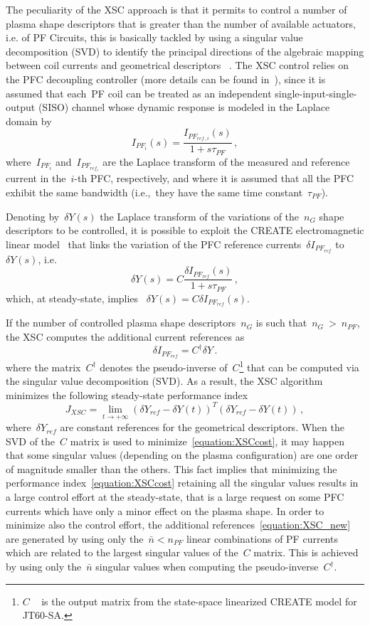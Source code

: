 The peculiarity of the XSC approach is that it permits to control a number of plasma shape descriptors that is greater than the number of available actuators, i.e. of PF Circuits, this  is basically tackled by using a singular value decomposition (SVD) to identify the principal directions of the algebraic mapping between coil currents and geometrical descriptors ~\cite{Albanese2005}. The XSC control relies on the PFC decoupling controller (more details can be found in~\cite[Section~4.4]{NCruz}), since it is assumed that each~PF coil can be treated as an independent single-input-single-output (SISO) channel whose dynamic response is modeled in the Laplace domain by
\[
I_{PF_i}(s) = \frac{I_{PF_{ref\,,i}}(s)}{1+s\tau_{PF}}\,,
\]
where~$I_{PF_i}$ and~$I_{PF_{ref_i}}$ are the Laplace transform of the measured and reference current in the~$i$-th PFC, respectively, and where it is assumed that all the PFC exhibit the same bandwidth (i.e.,~they have the same time constant~$\tau_{PF}$).
\smallskip

Denoting by~$\delta Y(s)$ the Laplace transform of the variations of the~$n_G$ shape descriptors  to be controlled, it is possible to exploit the CREATE electromagnetic linear model~\cite{NCruz} that links the variation of the PFC reference currents~$\delta I_{PF_{ref}}$ to ~$\delta Y(s)$, i.e.
\[
\delta Y(s) = C\frac{\delta I_{PF_{ref}}(s)}{1+s\tau_{PF}}\,,
\]
which, at steady-state, implies~ $\delta Y(s) = C \delta I_{PF_{ref}}(s)$.

If the number of controlled plasma shape descriptors~$n_G$ is such that~$n_G~>~n_{PF}$, the XSC computes the additional current references as
\begin{equation}\label{equation:XSC_new}
\delta I_{PF_{ref}}=C^\dag\delta Y\,.
\end{equation}
where the matrix~$C^\dag$ denotes the pseudo-inverse of~$C$\footnote{$C$ ~ is the output matrix from the state-space linearized CREATE model for JT60-SA.} that can be computed via the singular value decomposition (SVD). As a result, the XSC algorithm minimizes the following steady-state performance index
\begin{equation}\label{equation:XSCcost}
J_{XSC} = \lim_{t\to +
	\infty}(\delta Y_{ref}-\delta Y(t))^T(\delta Y_{ref}-\delta Y(t))\,,
\end{equation}
where~$\delta Y_{ref}$ are constant references for the geometrical descriptors. When the SVD of the~$C$ matrix is used to minimize~\eqref{equation:XSCcost}, it may happen that some singular values (depending on the plasma configuration) are one order of magnitude smaller than the others. This fact implies that minimizing the performance index~\eqref{equation:XSCcost} retaining all the singular values results in a large control effort at the steady-state, that is a large request on some PFC currents which have only a minor effect on the plasma shape. In order to minimize also the control effort, the additional references~\eqref{equation:XSC_new} are generated by using only the~$\bar{n}<n_{PF}$ linear combinations of PF currents which are related to the largest singular values of the~$C$ matrix. This is achieved by using only the~$\bar{n}$ singular values when computing the pseudo-inverse~$C^\dag$.
\smallskip

